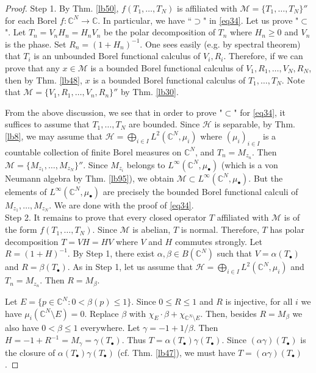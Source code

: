 \documentclass[12pt,b5paper,notitlepage]{article}
\theoremstyle{definition}
\theoremstyle{plain}
\newcommand{\mc}{\mathcal}
\newcommand{\blt}{\bullet}
\newcommand{\Cbb}{\mathbb C}
\numberwithin{equation}{section}
\begin{document}
\begin{proof}
Step 1. By Thm. \ref{lb50}, $f(T_1,\dots,T_N)$ is affiliated with $\mc M=\{T_1,\dots,T_N\}''$ for each Borel $f:\Cbb^N\rightarrow\Cbb$. In particular, we have ``$\supset$" in \eqref{eq34}. Let us prove "$\subset$". Let $T_n=V_nH_n=H_nV_n$ be the polar decomposition of $T_n$ where $H_n\geq0$ and $V_n$ is the phase. Set $R_n=(1+H_n)^{-1}$. One sees easily (e.g. by spectral theorem) that $T_i$ is an unbounded Borel functional calculus of $V_i,R_i$. Therefore, if we can prove that any $x\in\mc M$ is a bounded Borel functional calculus of $V_1,R_1,\dots,V_N,R_N$, then by Thm. \ref{lb48}, $x$ is a bounded Borel functional calculus of $T_1,\dots,T_N$. Note that $\mc M=\{V_1,R_1,\dots,V_n,R_n\}''$ by Thm. \ref{lb30}.

From the above discussion, we see that in order to prove "$\subset$" for \eqref{eq34}, it suffices to assume that $T_1,\dots,T_N$ are bounded. Since $\mc H$ is separable, by Thm. \ref{lb8}, we may assume that $\mc H=\bigoplus_{i\in I}L^2(\Cbb^N,\mu_i)$ where $(\mu_i)_{i\in I}$ is a countable collection of finite Borel measures on $\Cbb^N$, and $T_n=M_{z_n}$. Then $\mc M=\{M_{z_1},\dots,M_{z_N}\}''$. Since $M_{z_i}$ belongs to $L^\infty(\Cbb^N,\mu_\blt)$ (which is a von Neumann algebra by Thm. \ref{lb95}), we obtain $\mc M\subset L^\infty(\Cbb^N,\mu_\blt)$. But the elements of $L^\infty(\Cbb^N,\mu_\blt)$ are precisely the bounded Borel functional calculi of $M_{z_1},\dots,M_{z_N}$. We are done with the proof of \eqref{eq34}.\\[-1ex]

Step 2. It remains to prove that every closed operator $T$ affiliated with $\mc M$ is of the form $f(T_1,\dots,T_N)$. Since $\mc M$ is abelian, $T$ is normal. Therefore, $T$ has polar decomposition $T=VH=HV$ where $V$ and $H$ commutes strongly. Let $R=(1+H)^{-1}$. By Step 1, there exist $\alpha,\beta\in B(\Cbb^N)$ such that $V=\alpha(T_\blt)$ and $R=\beta(T_\blt)$. As in Step 1, let us assume that $\mc H=\bigoplus_{i\in I} L^2(\Cbb^N,\mu_i)$ and $T_n=M_{z_n}$. Then $R=M_\beta$. 

Let $E=\{p\in\Cbb^N:0<\beta(p)\leq 1\}$. Since $0\leq R\leq 1$ and $R$ is injective, for all $i$ we have $\mu_i(\Cbb^N\setminus E)=0$. Replace $\beta$ with $\chi_E\cdot\beta+\chi_{\Cbb^N\setminus E}$. Then, besides $R=M_\beta$ we also have $0<\beta\leq 1$ everywhere. Let $\gamma=-1+1/\beta$. Then $H=-1+R^{-1}=M_\gamma=\gamma(T_\blt)$. Thus $T=\alpha(T_\blt)\gamma(T_\blt)$. Since $(\alpha\gamma)(T_\blt)$ is the closure of $\alpha(T_\blt)\gamma(T_\blt)$ (cf. Thm. \ref{lb47}), we must have $T=(\alpha\gamma)(T_\blt)$.
\end{proof}
\end{document}
